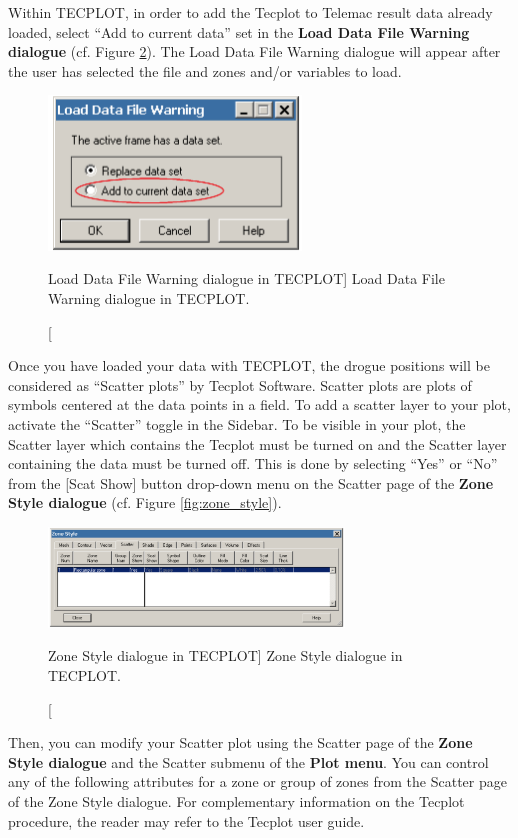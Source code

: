 Within TECPLOT, in order to add the Tecplot  to Telemac
result data already loaded, select ``Add to current data'' set in the
\textbf{Load Data File Warning dialogue} (cf. Figure \ref{fig:load_data}). The
Load Data File Warning dialogue will appear after the user has selected the
file and zones and/or variables to load.

\begin{figure}[H]%
\begin{center}
%
  \includegraphics[width=0.6\textwidth]{./graphics/load_data}
%
\end{center}
\caption
[Load Data File Warning dialogue in TECPLOT]
{Load Data File Warning dialogue in TECPLOT.}
\label{fig:load_data}
\end{figure}

Once you have loaded your data with TECPLOT, the drogue positions will be
considered as ``Scatter plots'' by Tecplot Software. Scatter plots are plots of
symbols centered at the data points in a field. To add a scatter layer to your
plot, activate the ``Scatter'' toggle in the Sidebar. To be visible in your
plot, the Scatter layer which contains the Tecplot  must be turned on and the Scatter layer containing the  data must be turned off. This is done by selecting ``Yes'' or ``No'' from
the [Scat Show] button drop-down menu on the Scatter page of the \textbf{Zone
Style dialogue} (cf. Figure \ref{fig:zone_style}).

\begin{figure}[H]%
\begin{center}
%
  \includegraphics[width=0.7\textwidth]{./graphics/zone_style}
%
\end{center}
\caption
[Zone Style dialogue in TECPLOT]
{Zone Style dialogue in TECPLOT.}
\label{fig:load_data}
\end{figure}

Then, you can modify your Scatter plot using the Scatter page of the
\textbf{Zone Style dialogue} and the Scatter submenu of the \textbf{Plot menu}.
You can control any of the following attributes for a zone or group of zones
from the Scatter page of the Zone Style dialogue. For complementary information
on the Tecplot procedure, the reader may refer to the Tecplot user guide.
